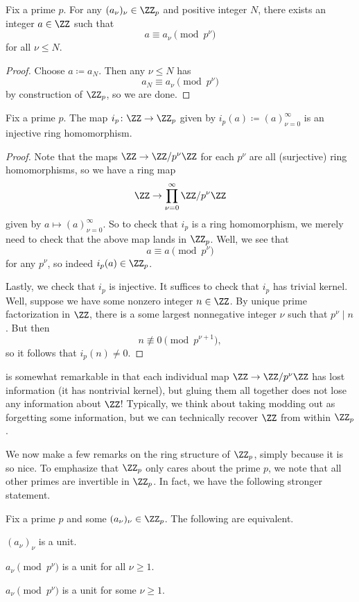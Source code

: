 \documentclass[../notes.tex]{subfiles}
\begin{document}
\begin{lemma}
	Fix a prime $p$. For any $(a_\nu)_\nu\in\ZZ_p$ and positive integer $N$, there exists an integer $a\in\ZZ$ such that
	\[a\equiv a_\nu\pmod{p^\nu}\]
	for all $\nu\le N$.
\end{lemma}
\begin{proof}
	Choose $a\coloneqq a_N$. Then any $\nu\le N$ has
	\[a_N\equiv a_\nu\pmod{p^\nu}\]
	by construction of $\ZZ_p$, so we are done.
\end{proof}
\begin{lemma} \label{lem:z-into-zp}
	Fix a prime $p$. The map $i_p\colon\ZZ\to\ZZ_p$ given by $i_p(a)\coloneqq(a)_{\nu=0}^\infty$ is an injective ring homomorphism.
\end{lemma}
\begin{proof}
	Note that the maps $\ZZ\to\ZZ/p^\nu\ZZ$ for each $p^\nu$ are all (surjective) ring homomorphisms, so we have a ring map
	\[\ZZ\to\prod_{\nu=0}^\infty\ZZ/p^\nu\ZZ\]
	given by $a\mapsto(a)_{\nu=0}^\infty$. So to check that $i_p$ is a ring homomorphism, we merely need to check that the above map lands in $\ZZ_p$. Well, we see that
	\[a\equiv a\pmod{p^\nu}\]
	for any $p^\nu$, so indeed $i_p(a)\in\ZZ_p$.

	Lastly, we check that $i_p$ is injective. It suffices to check that $i_p$ has trivial kernel. Well, suppose we have some nonzero integer $n\in\ZZ$. By unique prime factorization in $\ZZ$, there is a some largest nonnegative integer $\nu$ such that $p^\nu\mid n$. But then
	\[n\not\equiv0\pmod{p^{\nu+1}},\]
	so it follows that $i_p(n)\ne0$.
\end{proof}
\begin{remark}
	 is somewhat remarkable in that each individual map $\ZZ\to\ZZ/p^\nu\ZZ$ has lost information (it has nontrivial kernel), but gluing them all together does not lose any information about $\ZZ$! Typically, we think about taking modding out as forgetting some information, but we can technically recover $\ZZ$ from within $\ZZ_p$.
\end{remark}
We now make a few remarks on the ring structure of $\ZZ_p$, simply because it is so nice. To emphasize that $\ZZ_p$ only cares about the prime $p$, we note that all other primes are invertible in $\ZZ_p$. In fact, we have the following stronger statement.
\begin{proposition} \label{prop:units-in-zp}
	Fix a prime $p$ and some $(a_\nu)_\nu\in\ZZ_p$. The following are equivalent.
	\begin{listalph}
		\item $(a_\nu)_\nu$ is a unit.
		\item $a_\nu\pmod{p^\nu}$ is a unit for all $\nu\ge1$.
		\item $a_\nu\pmod{p^\nu}$ is a unit for some $\nu\ge1$.
	\end{listalph}
\end{proposition}
\end{document}
